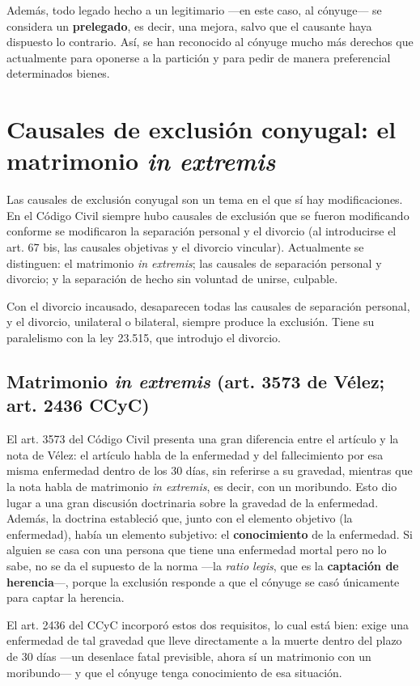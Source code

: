 \documentclass[12pt,oneside]{book}
\begin{document}
Además, todo legado hecho a un legitimario ---en este caso, al cónyuge--- se considera un \textbf{prelegado}, es decir, una mejora, salvo que el causante haya dispuesto lo contrario. Así, se han reconocido al cónyuge mucho más derechos que actualmente para oponerse a la partición y para pedir de manera preferencial determinados bienes.

\section{Causales de exclusión conyugal: el matrimonio \textit{in extremis}}

Las causales de exclusión conyugal son un tema en el que sí hay modificaciones. En el Código Civil siempre hubo causales de exclusión que se fueron modificando conforme se modificaron la separación personal y el divorcio (al introducirse el art. 67 bis, las causales objetivas y el divorcio vincular). Actualmente se distinguen: el matrimonio \textit{in extremis}; las causales de separación personal y divorcio; y la separación de hecho sin voluntad de unirse, culpable.

Con el divorcio incausado, desaparecen todas las causales de separación personal, y el divorcio, unilateral o bilateral, siempre produce la exclusión. Tiene su paralelismo con la ley 23.515, que introdujo el divorcio.

\subsection{Matrimonio \textit{in extremis} (art. 3573 de Vélez; art. 2436 CCyC)}

El art. 3573 del Código Civil presenta una gran diferencia entre el artículo y la nota de Vélez: el artículo habla de la enfermedad y del fallecimiento por esa misma enfermedad dentro de los 30 días, sin referirse a su gravedad, mientras que la nota habla de matrimonio \textit{in extremis}, es decir, con un moribundo. Esto dio lugar a una gran discusión doctrinaria sobre la gravedad de la enfermedad. Además, la doctrina estableció que, junto con el elemento objetivo (la enfermedad), había un elemento subjetivo: el \textbf{conocimiento} de la enfermedad. Si alguien se casa con una persona que tiene una enfermedad mortal pero no lo sabe, no se da el supuesto de la norma ---la \textit{ratio legis}, que es la \textbf{captación de herencia}---, porque la exclusión responde a que el cónyuge se casó únicamente para captar la herencia.

El art. 2436 del CCyC incorporó estos dos requisitos, lo cual está bien: exige una enfermedad de tal gravedad que lleve directamente a la muerte dentro del plazo de 30 días ---un desenlace fatal previsible, ahora sí un matrimonio con un moribundo--- y que el cónyuge tenga conocimiento de esa situación.
\end{document}
